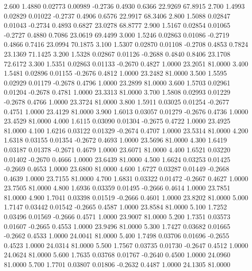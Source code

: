    2.600   1.4880   0.02773   0.00989  -0.2736   0.4930   0.6366  22.9269  67.8915
   2.700   1.4993   0.02829   0.01022  -0.2737   0.4906   0.6576  22.9917  68.3406
   2.800   1.5088   0.02847   0.01043  -0.2734   0.4893   0.6827  23.0278  68.8777
   2.900   1.5167   0.02854   0.01065  -0.2727   0.4880   0.7086  23.0619  69.4499
   3.000   1.5246   0.02863   0.01086  -0.2719   0.4866   0.7416  23.0994  70.1875
   3.100   1.5307   0.02870   0.01108  -0.2708   0.4853   0.7824  23.1369  71.1425
   3.200   1.5328   0.02867   0.01126  -0.2688   0.4840   0.8406  23.1708  72.6172
   3.300   1.5351   0.02863   0.01133  -0.2670   0.4827   1.0000  23.2051  81.0000
   3.400   1.5481   0.02896   0.01155  -0.2676   0.4812   1.0000  23.2482  81.0000
   3.500   1.5595   0.02929   0.01179  -0.2678   0.4796   1.0000  23.2899  81.0000
   3.600   1.5703   0.02961   0.01204  -0.2678   0.4781   1.0000  23.3313  81.0000
   3.700   1.5808   0.02993   0.01229  -0.2678   0.4766   1.0000  23.3724  81.0000
   3.800   1.5911   0.03025   0.01254  -0.2677   0.4751   1.0000  23.4129  81.0000
   3.900   1.6013   0.03057   0.01279  -0.2676   0.4736   1.0000  23.4529  81.0000
   4.000   1.6115   0.03090   0.01304  -0.2675   0.4722   1.0000  23.4925  81.0000
   4.100   1.6216   0.03122   0.01329  -0.2674   0.4707   1.0000  23.5314  81.0000
   4.200   1.6318   0.03155   0.01354  -0.2672   0.4693   1.0000  23.5696  81.0000
   4.300   1.6419   0.03187   0.01378  -0.2671   0.4679   1.0000  23.6071  81.0000
   4.400   1.6521   0.03220   0.01402  -0.2670   0.4666   1.0000  23.6439  81.0000
   4.500   1.6624   0.03253   0.01425  -0.2669   0.4653   1.0000  23.6800  81.0000
   4.600   1.6727   0.03287   0.01449  -0.2668   0.4639   1.0000  23.7155  81.0000
   4.700   1.6831   0.03322   0.01472  -0.2667   0.4627   1.0000  23.7505  81.0000
   4.800   1.6936   0.03359   0.01495  -0.2666   0.4614   1.0000  23.7851  81.0000
   4.900   1.7041   0.03398   0.01519  -0.2666   0.4601   1.0000  23.8202  81.0000
   5.000   1.7147   0.03442   0.01542  -0.2665   0.4587   1.0000  23.8584  81.0000
   5.100   1.7252   0.03496   0.01569  -0.2666   0.4571   1.0000  23.9007  81.0000
   5.200   1.7351   0.03573   0.01607  -0.2665   0.4553   1.0000  23.9496  81.0000
   5.300   1.7427   0.03682   0.01665  -0.2662   0.4533   1.0000  24.0041  81.0000
   5.400   1.7498   0.03706   0.01696  -0.2655   0.4523   1.0000  24.0314  81.0000
   5.500   1.7567   0.03735   0.01730  -0.2647   0.4512   1.0000  24.0624  81.0000
   5.600   1.7635   0.03768   0.01767  -0.2640   0.4500   1.0000  24.0960  81.0000
   5.700   1.7701   0.03807   0.01806  -0.2632   0.4487   1.0000  24.1305  81.0000
